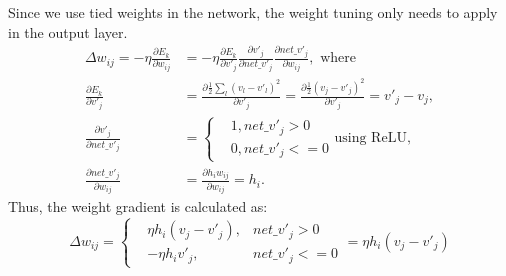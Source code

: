Since we use tied weights in the network, the weight tuning only needs to apply in the output layer.
\begin{equation}
\begin{aligned}
\Delta w_{ij} = -\eta \frac{\partial E_k}{\partial w_{ij}} &= -\eta \frac{\partial E_k}{\partial v'_j} \frac{\partial v'_j}{\partial net\_v'_j} \frac{\partial net\_v'_j}{\partial w_{ij}}, \textrm{ where} \\
\frac{\partial E_k}{\partial v'_j} &= \frac{\partial \frac{1}{2} \sum_l (v_l - {v'}_l)^2}{\partial v'_j}= \frac{\partial \frac{1}{2}(v_j - {v'}_j)^2}{\partial v'_j}= v'_j - v_j, \\
\frac{\partial v'_j}{\partial net\_v'_j} &=\left\{
	\begin{aligned}
    & 1, net\_v'_j > 0 \\
    & 0, net\_v'_j < = 0
    \end{aligned} 
    \right.    \textrm{using ReLU, }\\
\frac{\partial net\_v'_j}{\partial w_{ij}} &= \frac{\partial h_i w_{ij}}{\partial w_{ij}} = h_i.
\end{aligned}
\end{equation}
Thus, the weight gradient is calculated as:
\begin{equation}
\label{equ:ae_widrow_hoff}
\Delta w_{ij} = \left \{
	\begin{aligned}
	& \eta h_i(v_j - v'_j), &net\_v'_j > 0 \\
	&-\eta h_i v'_j, & net\_v'_j < = 0
	\end{aligned} 
	= \eta h_i(v_j - v'_j)
\right.
\end{equation}


